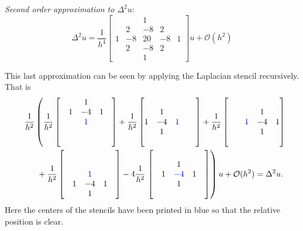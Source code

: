 \documentclass[12pt]{article}
\begin{document}
\textit{Second order approximation to $\Delta^2 u$}:
$$
\Delta^2 u = \frac{1}{h^4}\begin{bmatrix}&&1&&\\&2&-8&2&\\1&-8&20&-8&1\\&2&-8&2&\\&&1&&\end{bmatrix}u + \mathcal{O}(h^2)
$$

This last approximation can be seen by applying the Laplacian stencil recursively. That is
\begin{align*}
	\phantom{=}& \frac{1}{h^2}\left( \frac{1}{h^2}\begin{bmatrix}&&1&&\\&1&-4&1&\\&&\color{blue}1&&\\&&&&\\&&&&\end{bmatrix} +
	\frac{1}{h^2}\begin{bmatrix}&&&&\\&1&&&\\1&-4&\color{blue}1&&\\&1&&&\\&&&&\end{bmatrix} +
	\frac{1}{h^2}\begin{bmatrix}&&&&\\&&&1&\\&&\color{blue}1&-4&1\\&&&1&\\&&&&\end{bmatrix} \right.\\
	& \phantom{==}+
	\frac{1}{h^2}\begin{bmatrix}&&&&\\&&&&\\&&\color{blue}1&&\\&1&-4&1&\\&&1&&\end{bmatrix} 
	-4 \frac{1}{h^2} 
	\left. \begin{bmatrix}&&&&\\&&1&&\\&1&\color{blue}-4&1&\\&&1&&\\&&&&\end{bmatrix}
	\right)u + \mathcal{O}(h^2)= \Delta^2 u.
\end{align*}
Here the centers of the stencils have been printed in {\color{blue}blue} so that the relative position is clear. \bigbreak
\end{document}
